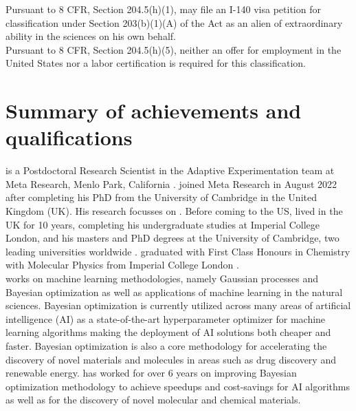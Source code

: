 \documentclass[11pt]{article}
\begin{document}
Pursuant to 8 CFR, Section 204.5(h)(1), \dr may file an I-140 visa petition for classification under Section 203(b)(1)(A) of the Act as an alien of extraordinary ability in the sciences on his own behalf.\\

Pursuant to 8 CFR, Section 204.5(h)(5), neither an offer for employment in the United States nor a labor certification is required for this classification.


\newpage
\section{Summary of \drs achievements and qualifications}

\dr is a Postdoctoral Research Scientist in the Adaptive Experimentation team at Meta Research, Menlo Park, California \cite{metaoffer}. \dr joined Meta Research in August 2022 after completing his PhD from the University of Cambridge in the United Kingdom (UK). His research focusses on \fie{}. Before coming to the US, \dr lived in the UK for 10 years, completing his undergraduate studies at Imperial College London, and his masters and PhD degrees at the University of Cambridge, two leading universities worldwide \cite{cv} \cite{degrees}. \dr graduated with First Class Honours in Chemistry with Molecular Physics from Imperial College London \cite{degrees}.\\



\dr works on machine learning methodologies, namely Gaussian processes and Bayesian optimization as well as applications of machine learning in the natural sciences. Bayesian optimization is currently utilized across many areas of artificial intelligence (AI) as a state-of-the-art hyperparameter optimizer for machine learning algorithms making the deployment of AI solutions both cheaper and faster. Bayesian optimization is also a core methodology for accelerating the discovery of novel materials and molecules in areas such as drug discovery and renewable energy. \dr has worked for over 6 years on improving Bayesian optimization methodology to achieve speedups and cost-savings for AI algorithms as well as for the discovery of novel molecular and chemical materials. \\
\end{document}
